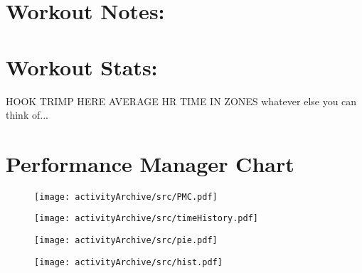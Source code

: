 \documentclass[letterpaper]{article}
\begin{document}
\section{Workout Notes:}



\section{Workout Stats:}
HOOK TRIMP HERE
AVERAGE HR
TIME IN ZONES
whatever else you can think of...

\section{Performance Manager Chart}
\begin{figure}[H]
\centering
\texttt{[image: activityArchive/src/PMC.pdf]}
\end{figure}

\begin{figure}[H]
\centering
\texttt{[image: activityArchive/src/timeHistory.pdf]}
\end{figure}
\begin{figure}[H]
\centering
\texttt{[image: activityArchive/src/pie.pdf]}
\end{figure}
\begin{figure}[H]
\centering
\texttt{[image: activityArchive/src/hist.pdf]}
\end{figure}
\end{document}
